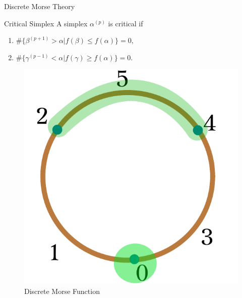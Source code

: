 \documentclass[9pt,sans-serif]{beamer}
\begin{document}
\begin{frame}{Discrete Morse Theory}
  \begin{block}{Critical Simplex}
    A simplex $\alpha^{(p)}$ is critical if
    \begin{enumerate}
    \item $\#\{\beta^{(p+1)}>\alpha | f(\beta)\leq   f(\alpha)\}=0,$
    \item $\#\{\gamma^{(p-1)}<\alpha | f(\gamma)\geq f(\alpha)\}=0.$ 
    \end{enumerate}
  \end{block}
  
  \pause
  
  \begin{figure}[htb]
    \centering \includegraphics[scale=0.5]{discreteCritical}
    \caption{Discrete Morse Function}
  \end{figure}
  
\end{frame}
\end{document}
